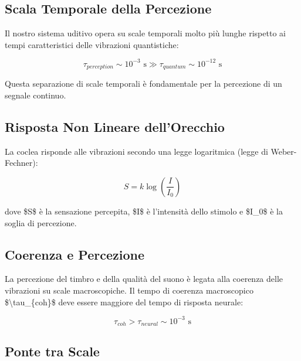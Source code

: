 \documentclass[a4paper,11pt]{article}
\begin{document}
\subsection{Scala Temporale della Percezione}\hypertarget{scala-temporale-della-percezione}{}\label{scala-temporale-della-percezione}

Il nostro sistema uditivo opera su scale temporali molto più lunghe
rispetto ai tempi caratteristici delle vibrazioni quantistiche:

\begin{displaymath}
\tau_{perception} \sim 10^{-3} \text{ s} \gg \tau_{quantum} \sim 10^{-12} \text{ s}
\end{displaymath}

Questa separazione di scale temporali è fondamentale per la percezione
di un segnale continuo.

\subsection{Risposta Non Lineare dell'Orecchio}\hypertarget{risposta-non-lineare-dellorecchio}{}\label{risposta-non-lineare-dellorecchio}

La coclea risponde alle vibrazioni secondo una legge logaritmica (legge
di Weber-Fechner):

\begin{displaymath}
S = k \log\left(\frac{I}{I_0}\right)
\end{displaymath}

dove \$S\$ è la sensazione percepita, \$I\$ è l'intensità dello stimolo e
\$I\_0\$ è la soglia di percezione.

\subsection{Coerenza e Percezione}\hypertarget{coerenza-e-percezione}{}\label{coerenza-e-percezione}

La percezione del timbro e della qualità del suono è legata alla
coerenza delle vibrazioni su scale macroscopiche. Il tempo di coerenza
macroscopico \$\textbackslash{}tau\_\{coh\}\$ deve essere maggiore del tempo di risposta
neurale:

\begin{displaymath}
\tau_{coh} > \tau_{neural} \sim 10^{-3} \text{ s}
\end{displaymath}

\subsection{Ponte tra Scale}\hypertarget{ponte-tra-scale}{}\label{ponte-tra-scale}
\end{document}
